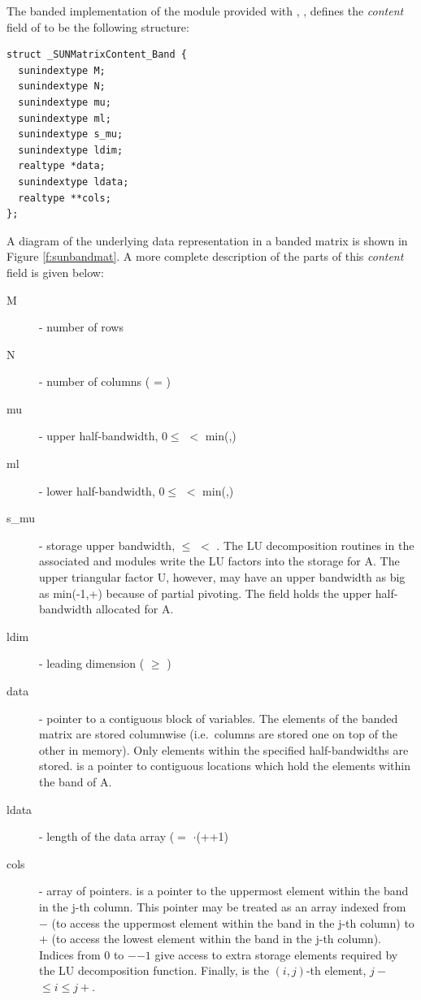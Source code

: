 
The banded implementation of the {\sunmatrix} module provided with
{\sundials}, {\sunmatband}, defines the {\em content} field
of  to be the following structure:
\begin{verbatim} 
struct _SUNMatrixContent_Band {
  sunindextype M;
  sunindextype N;
  sunindextype mu;
  sunindextype ml;
  sunindextype s_mu;
  sunindextype ldim;
  realtype *data;
  sunindextype ldata;
  realtype **cols;
};
\end{verbatim}
A diagram of the underlying data representation in a banded matrix is
shown in Figure \ref{f:sunbandmat}.  A more complete description of the
parts of this \emph{content} field is given below:
\begin{description}
  \item[M] - number of rows
  \item[N] - number of columns ( = )
  \item[mu] - upper half-bandwidth, $0 \le$  $<$ min(,)
  \item[ml] - lower half-bandwidth, $0 \le$  $<$ min(,)
  \item[s\_mu] - storage upper bandwidth,  $\le$  $<$ .
    The LU decomposition routines in the associated {\sunlinsolband}
    and {\sunlinsollapband} modules write the LU factors into the
    storage for A. The upper triangular factor U, however, may have  
    an upper bandwidth as big as min(-1,+) because of 
    partial pivoting. The  field holds the upper
  half-bandwidth allocated for A.
  \item[ldim] - leading dimension ( $\ge$ )
  \item[data] - pointer to a contiguous block of  variables.
    The elements of the banded matrix are stored columnwise
    (i.e.~columns are stored one on top of the other in memory). Only
    elements within the specified half-bandwidths are stored.     
     is a pointer to  contiguous locations   
    which hold the elements within the band of A.  
  \item[ldata] - length of the data array
    ($=$ $\cdot$(++1) 
  \item[cols] - array of pointers.  is a pointer to the
    uppermost element within the band in the j-th column. This pointer
    may be treated as an array indexed from $-$ (to
    access the uppermost element within the band in the j-th column)
    to $+$ (to access the lowest element within the
    band in the j-th column). Indices from $0$ to
    $-$$-1$ give access to extra storage elements
    required by the LU decomposition function.
    Finally,  is the $(i,j)$-th element,
    $j-$ $\le i \le j+$.  
\end{description}
